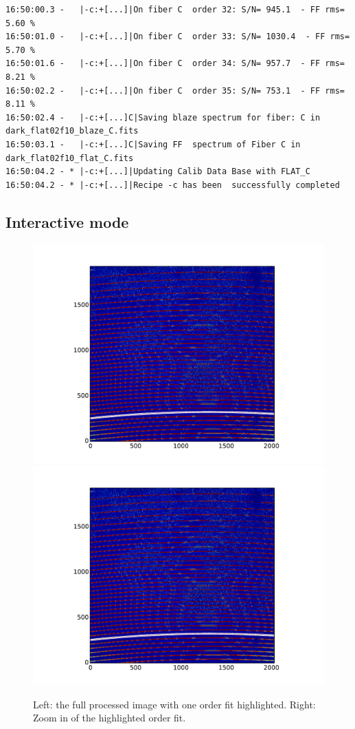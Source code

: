 \begin{lstlisting}[style=text]
16:50:00.3 -   |-c:+[...]|On fiber C  order 32: S/N= 945.1  - FF rms= 5.60 %
16:50:01.0 -   |-c:+[...]|On fiber C  order 33: S/N= 1030.4  - FF rms= 5.70 %
16:50:01.6 -   |-c:+[...]|On fiber C  order 34: S/N= 957.7  - FF rms= 8.21 %
16:50:02.2 -   |-c:+[...]|On fiber C  order 35: S/N= 753.1  - FF rms= 8.11 %
16:50:02.4 -   |-c:+[...]C|Saving blaze spectrum for fiber: C in dark_flat02f10_blaze_C.fits
16:50:03.1 -   |-c:+[...]C|Saving FF  spectrum of Fiber C in dark_flat02f10_flat_C.fits
16:50:04.2 - * |-c:+[...]|Updating Calib Data Base with FLAT_C
16:50:04.2 - * |-c:+[...]|Recipe -c has been  successfully completed
\end{lstlisting}

\subsection{Interactive mode}

\begin{figure}
\begin{center}
\includegraphics[width=.59\textwidth]{figures/cal_FF_RAW_spirou_1.pdf}
\includegraphics[width=.29\textwidth]{figures/cal_FF_RAW_spirou_1.pdf}
\caption{Left: the full processed image with one order fit highlighted. Right: Zoom in of the highlighted order fit. \label{figure:cal_FF_RAW_spirou_1}}
\end{center}
\end{figure}

